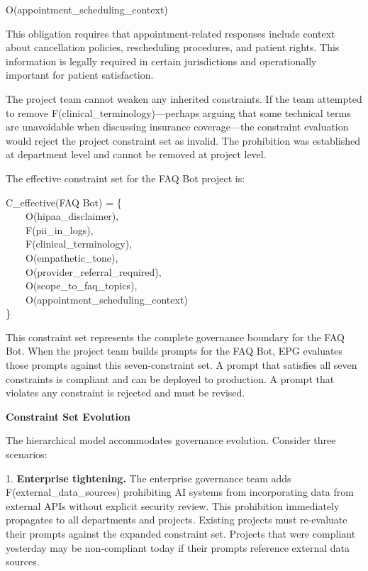 \begin{claddisp}
O(appointment\_scheduling\_context)
\end{claddisp}


This obligation requires that appointment-related responses include context about cancellation policies, rescheduling procedures, and patient rights. This information is legally required in certain jurisdictions and operationally important for patient satisfaction.

The project team cannot weaken any inherited constraints. If the team attempted to remove F(clinical\_\allowbreak{}terminology)---perhaps arguing that some technical terms are unavoidable when discussing insurance coverage---the constraint evaluation would reject the project constraint set as invalid. The prohibition was established at department level and cannot be removed at project level.

The effective constraint set for the FAQ Bot project is:

\begin{claddisp}
C\_effective(FAQ Bot) = \{\\
~~~~O(hipaa\_disclaimer),\\
~~~~F(pii\_in\_logs),\\
~~~~F(clinical\_terminology),\\
~~~~O(empathetic\_tone),\\
~~~~O(provider\_referral\_required),\\
~~~~O(scope\_to\_faq\_topics),\\
~~~~O(appointment\_scheduling\_context)\\
\}
\end{claddisp}


This constraint set represents the complete governance boundary for the FAQ Bot. When the project team builds prompts for the FAQ Bot, EPG evaluates those prompts against this seven-constraint set. A prompt that satisfies all seven constraints is compliant and can be deployed to production. A prompt that violates any constraint is rejected and must be revised.

\textbf{Constraint Set Evolution}

The hierarchical model accommodates governance evolution. Consider three scenarios:

1. \textbf{Enterprise tightening.} The enterprise governance team adds F(external\_\allowbreak{}data\_\allowbreak{}sources) prohibiting AI systems from incorporating data from external APIs without explicit security review. This prohibition immediately propagates to all departments and projects. Existing projects must re-evaluate their prompts against the expanded constraint set. Projects that were compliant yesterday may be non-compliant today if their prompts reference external data sources.

